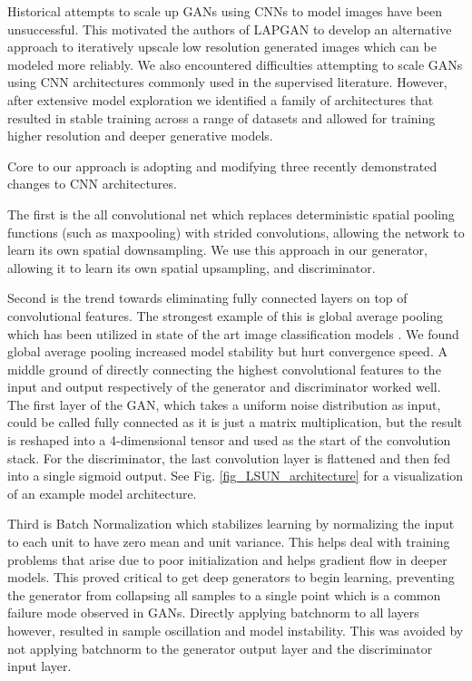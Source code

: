\documentclass{article} \usepackage{iclr2016_conference,times}
\begin{document}
Historical attempts to scale up GANs using CNNs to model images have been unsuccessful. This motivated the authors of LAPGAN \citep{denton2015deep} to develop an alternative approach to iteratively upscale low resolution generated images which can be modeled more reliably. We also encountered difficulties attempting to scale GANs using CNN architectures commonly used in the supervised literature. However, after extensive model exploration we identified a family of architectures that resulted in stable training across a range of datasets and allowed for training higher resolution and deeper generative models.

Core to our approach is adopting and modifying three recently demonstrated changes to CNN architectures. 

The first is the all convolutional net \citep{springenberg2014striving} which replaces deterministic spatial pooling functions (such as maxpooling) with strided convolutions, allowing the network to learn its own spatial downsampling. We use this approach in our generator, allowing it to learn its own spatial upsampling, and discriminator.

Second is the trend towards eliminating fully connected layers on top of convolutional features. The strongest example of this is global average pooling which has been utilized in state of the art image classification models \citep{Inceptionism2015}. We found global average pooling increased model stability but hurt convergence speed. A middle ground of directly connecting the highest convolutional features to the input and output respectively of the generator and discriminator worked well. The first layer of the GAN, which takes a uniform noise distribution  as input, could be called fully connected as it is just a matrix multiplication, but the result is reshaped into a 4-dimensional tensor and used as the start of the convolution stack. For the discriminator, the last convolution layer is flattened and then fed into a single sigmoid output. See Fig. \ref{fig_LSUN_architecture} for a visualization of an example model architecture.

Third is Batch Normalization \citep{ioffe2015batch} which stabilizes learning by normalizing the input to each unit to have zero mean and unit variance. This helps deal with training problems that arise due to poor initialization and helps gradient flow in deeper models. This proved critical to get deep generators to begin learning, preventing the generator from collapsing all samples to a single point which is a common failure mode observed in GANs. Directly applying batchnorm to all layers however, resulted in sample oscillation and model instability. This was avoided by not applying batchnorm to the generator output layer and the discriminator input layer.
\end{document}

